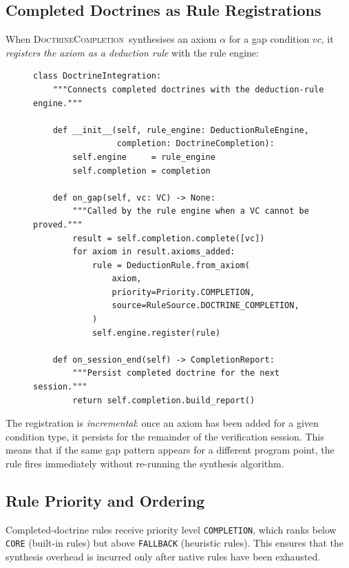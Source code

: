 \documentclass[11pt]{article}
\newcommand{\VC}{\mathit{vc}}             %
\newcommand{\DoctrineCompletion}{\textsc{DoctrineCompletion}}
\begin{document}
\subsection{Completed Doctrines as Rule Registrations}

When \DoctrineCompletion\ synthesises an axiom $\alpha$ for a gap
condition $\VC$, it \emph{registers the axiom as a deduction rule} with
the rule engine:

\begin{figure}[H]
\begin{lstlisting}[style=jugeo-python, caption={Completed-doctrine integration with
  the rule engine (doctrine\_completion/integration.py, simplified)},
  label=alg:integration]
class DoctrineIntegration:
    """Connects completed doctrines with the deduction-rule engine."""

    def __init__(self, rule_engine: DeductionRuleEngine,
                 completion: DoctrineCompletion):
        self.engine     = rule_engine
        self.completion = completion

    def on_gap(self, vc: VC) -> None:
        """Called by the rule engine when a VC cannot be proved."""
        result = self.completion.complete([vc])
        for axiom in result.axioms_added:
            rule = DeductionRule.from_axiom(
                axiom,
                priority=Priority.COMPLETION,
                source=RuleSource.DOCTRINE_COMPLETION,
            )
            self.engine.register(rule)

    def on_session_end(self) -> CompletionReport:
        """Persist completed doctrine for the next session."""
        return self.completion.build_report()
\end{lstlisting}
\end{figure}

The registration is \emph{incremental}: once an axiom has been added
for a given condition type, it persists for the remainder of the
verification session.  This means that if the same gap pattern appears
for a different program point, the rule fires immediately without
re-running the synthesis algorithm.

\subsection{Rule Priority and Ordering}

Completed-doctrine rules receive priority level \texttt{COMPLETION},
which ranks below \texttt{CORE} (built-in rules) but above
\texttt{FALLBACK} (heuristic rules).  This ensures that the synthesis
overhead is incurred only after native rules have been exhausted.
\end{document}
